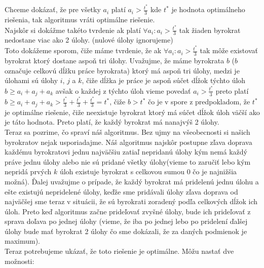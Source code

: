 \documentclass[a4paper]{article}
\begin{document}
Chceme dokázať, že pre všetky $a_i$ platí $a_i > \frac{t^*}{3}$ kde $t^*$ je hodnota optimálneho riešenia, tak algoritmus vráti optimálne riešenie.
\\

Najskôr si dokážme takéto tvrdenie ak platí $\forall a_i: a_i > \frac{t^*}{3}$ tak žiaden byrokrat nedostane viac ako 2 úlohy. (nulové úlohy ignorujeme)
\\

Toto dokážeme sporom, čiže máme tvrdenie, že ak $\forall a_i: a_i > \frac{t^*}{3}$ tak môže existovať byrokrat ktorý dostane aspoň tri úlohy.
Uvažujme, že máme byrokrata $b$ ($b$ označuje celkovú dĺžku práce byrokrata) ktorý má aspoň tri úlohy, medzi je úlohami sú úlohy $i$, $j$ a $k$, čiže dĺžka je práce je aspoň súčet dĺžok týchto úloh $b \geq a_i + a_j + a_k$ avšak o každej z týchto úloh vieme povedať $a_i > \frac{t^*}{3}$ preto platí $b \geq a_i + a_j + a_k > \frac{t^*}{3} + \frac{t^*}{3} +\frac{t^*}{3} = t^*$, čiže $b > t^*$ čo je v spore z predpokladom, že $t^*$ je optimálne riešenie, čiže neexistuje byrokrat ktorý má súčet dĺžok úloh väčší ako je táto hodnota. Preto platí, že každý byrokrat má nanajvýš 2 úlohy.
\\

Teraz sa pozrime, čo spraví náš algoritmus. Bez ujmy na všeobecnosti si našich byrokratov nejak usporiadajme. Náš algoritmus najskôr postupne zľava doprava každému byrokratovi jednu najväčšiu zatiaľ nepridanú úlohy kým nemá každý práve jednu úlohy alebo nie sú pridané všetky úlohy(vieme to zaručiť lebo kým nepridá prvých $k$ úloh existuje byrokrat s celkovou sumou 0 čo je najnižšia možná). Ďalej uvažujme o prípade, že každý byrokrat má pridelenú jednu úlohu a ešte existujú nepridelené úlohy, keďže sme pridávali úlohy zľava doprava od najväčšej sme teraz v situácii, že sú byrokrati zoradený podľa celkových dĺžok ich úloh. Preto keď algoritmus začne prideľovať zvyšné úlohy, bude ich prideľovať z sprava doľava po jednej úlohy (vieme, že iba po jednej lebo po pridelení ďalšej úlohy bude mať byrokrat 2 úlohy čo sme dokázali, že za daných podmienok je maximum). 
\\

Teraz potrebujeme ukázať, že toto riešenie je optimálne. Môžu nastať dve možnosti:
\end{document}
